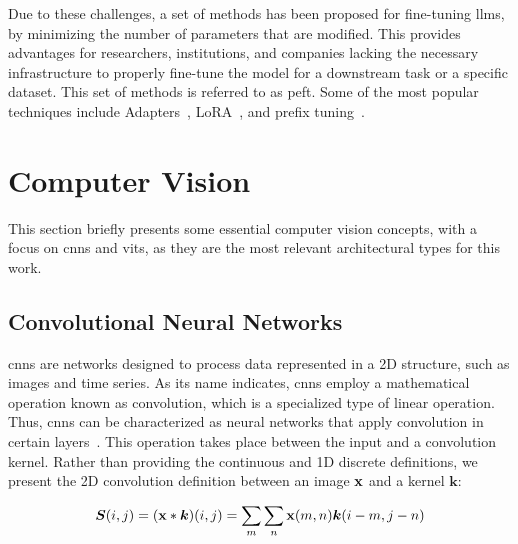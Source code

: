 Due to these challenges, a set of methods has been proposed for fine-tuning \glspl{llm}, by minimizing the number of parameters that are modified. This provides advantages for researchers, institutions, and companies lacking the necessary infrastructure to properly fine-tune the model for a downstream task or a specific dataset. This set of methods is referred to as \gls{peft}. Some of the most popular techniques include Adapters~\cite{houlsby2019parameterefficient}, LoRA~\cite{hu2021lora}, and prefix tuning~\cite{li2021prefixtuning}. %




\section{Computer Vision}

This section briefly presents some essential computer vision concepts, with a focus on \glspl{cnn} and \glspl{vit}, as they are the most relevant architectural types for this work.

\subsection{Convolutional Neural Networks}

\glspl{cnn} are networks designed to process data represented in a 2D structure, such as images and time series. As its name indicates, \glspl{cnn} employ a mathematical operation known as convolution, which is a specialized type of linear operation. Thus, \glspl{cnn} can be characterized as neural networks that apply convolution in certain layers~\cite{goodfellow2016deep}. This operation takes place between the input and a convolution kernel. Rather than providing the continuous and 1D discrete definitions, we present the 2D convolution definition between an image $\mathbf{x}$ and a kernel $\mathbf{k}$:

\begin{equation}
    \bm{S}(i,j) = (\mathbf{x}*\bm{k})(i,j) = \sum_m \sum_n \mathbf{x}(m,n)\bm{k}(i-m, j-n)
    \label{eq:convolution}
\end{equation}

